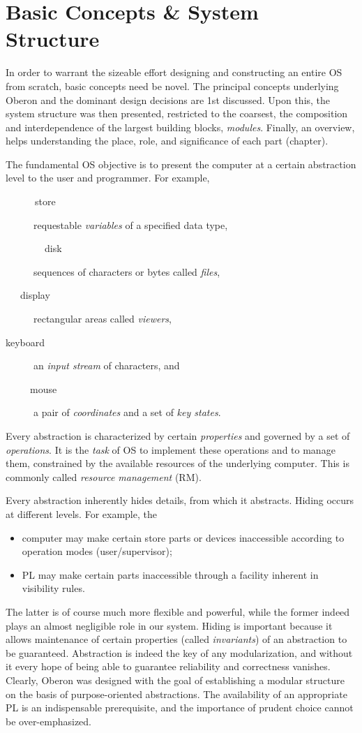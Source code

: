 \chapter{Basic Concepts \& System Structure}
\label{ch:struct}
In order to warrant the sizeable effort designing and constructing an entire OS from scratch,
basic concepts need be novel. The principal concepts underlying Oberon and the dominant
design decisions are 1st discussed. Upon this, the system structure was then presented,
restricted to the coarsest, the composition and interdependence of the largest building
blocks, \emph{modules}. Finally, an overview, helps understanding the place, role, and
significance of each part (chapter).

The fundamental OS objective is to present the computer at a certain abstraction level
to the user and programmer. For example,
\begin{description}
  \item[~~~~~~store] requestable \emph{variables} of a specified data type,
  \item[~~~~~~~~disk] sequences of characters or bytes called \emph{files},
  \item[~~~display] rectangular areas called \emph{viewers},
  \item[keyboard] an \emph{input stream} of characters, and
  \item[~~~~~mouse] a pair of \emph{coordinates} and a set of \emph{key states}.
\end{description}
Every abstraction is characterized by certain \emph{properties} and governed by a set of
\emph{operations}. It is the \emph{task} of OS to implement these operations and to manage
them, constrained by the available resources of the underlying computer. This is commonly
called \emph{resource management} (RM).

Every abstraction inherently hides details, from which it abstracts. Hiding occurs
at different levels. For example, the
\begin{itemize}
  \item computer may make certain store parts or devices inaccessible
    according to operation modes (user/supervisor);
  \item PL may make certain parts inaccessible through a facility
    inherent in visibility rules.
\end{itemize}
The latter is of course much more flexible and powerful, while the former indeed plays an
almost negligible role in our system. Hiding is important because it allows maintenance
of certain properties (called \emph{invariants}) of an abstraction to be guaranteed.
Abstraction is indeed the key of any modularization, and without it every hope of being
able to guarantee reliability and correctness vanishes. Clearly, Oberon was designed with
the goal of establishing a modular structure on the basis of purpose-oriented abstractions.
The availability of an appropriate PL is an indispensable prerequisite,
and the importance of prudent choice cannot be over-emphasized.

